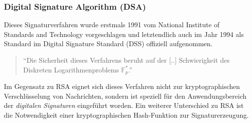 \documentclass[11pt,a4paper,ngerman]{scrreprt}
\begin{document}
\subsubsection{Digital Signature Algorithm (DSA)}
Dieses Signaturverfahren wurde erstmals 1991 vom National Institute of Standards and Technology vorgeschlagen und letztendlich auch im Jahr 1994 als Standard im Digital Signature Standard (DSS) offiziell aufgenommen.
\begin{quote}
    ``Die Sicherheit dieses Verfahrens beruht auf der [..] Schwierigkeit des Diskreten Logarithmenproblems $\mathbb{F}^*_p$.'' \cite[S. 45]{bsi-tr-02102-1}
\end{quote}
Im Gegensatz zu RSA eignet sich dieses Verfahren nicht zur kryptographischen Verschlüsselung von Nachrichten, sondern ist speziell für den Anwendungsbereich der \textit{digitalen Signaturen} eingeführt worden. Ein weiterer Unterschied zu RSA ist die Notwendigkeit einer kryptographischen Hash-Funktion zur Signaturerzeugung.
\end{document}
